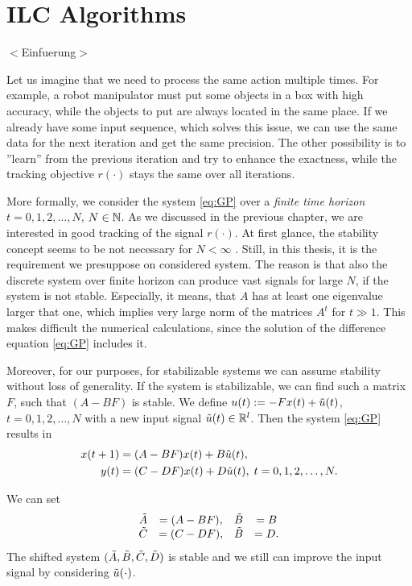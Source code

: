 \chapter{ILC Algorithms}
\label{ch:ILCAlg}
{\color{red} $<$Einfuerung$>$}

\newcommand{\IAgood}{30}
\newcommand{\IAbad}{50}
\newcommand{\badCondNb}{1.353$10^{16}$}

Let us imagine that we need to process the same action multiple times. 
For example, a robot manipulator must put some objects in a box with high accuracy, while the objects to put are always located in the same place. If we already have some input sequence, which solves this issue, we can use the same data for the next iteration and get the same precision. The other possibility is to ''learn'' from the previous iteration and try to enhance the exactness, while the tracking objective $r(\cdot)$ stays the same over all iterations.

More formally, we consider the system \eqref{eq:GP} over a \textit{finite time horizon} $t = 0, 1, 2, \dots, N$, $N \in {\mathbb{N}}$. As we discussed in the previous chapter, we are interested in good tracking of the signal $r(\cdot)$. At first glance, the stability concept seems to be not necessary for $N < \infty$ . Still, in this thesis, it is the requirement we presuppose on considered system. The reason is that also the discrete system over finite horizon can produce vast signals for large $N$, if the system is not stable. Especially, it means, that $A$ has at least one eigenvalue larger that one, which implies very large norm of the matrices $A^t$ for $t \gg 1$. This makes difficult the numerical calculations, since the solution of the difference equation \eqref{eq:GP} includes it. 

Moreover, for our purposes, for stabilizable systems we can assume stability without loss of generality.    
If the system is stabilizable, we can find such a matrix $F$, such that $(A - B F )$ is stable. 
We define $u(t) := - Fx(t) + \tilde{u}(t)$, $t = 0,1,2, \dots, N$ with a new input signal $\tilde{u} (t) \in {\mathbb{R}}^l$. Then the system \eqref{eq:GP} results in
\begin{align}
\begin{split}
x(t+1) &= (A - B F)x(t) + B \tilde{u} (t), \\
y(t)   &= (C - D F) x(t) + D\tilde{u}(t), \; t = 0, 1 ,2, \dots, N. 
\end{split}
\end{align}

We can set 
\begin{align}
\begin{array}{c c c c}
\tilde{A} &= (A - B F), &\tilde{B} &= B\\
\tilde{C}  & = (C - D F),&\tilde{B} & = D.
\end{array}
\end{align}
The shifted system $(\tilde{A}, \tilde{B} , \tilde{C}, \tilde{D})$ is stable and we still can improve the input signal by considering $\tilde{u}(\cdot)$.

